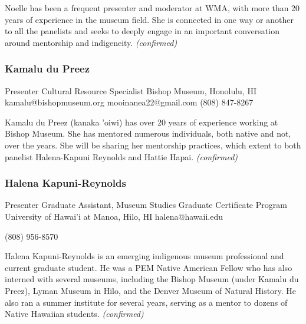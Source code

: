 \documentclass{report}
\begin{document}
                Noelle has been a frequent presenter and moderator at WMA, with more than 20 years of experience in the museum field. She is connected in one way or another to all the panelists and seeks to deeply engage in an important conversation around mentorship and indigeneity.\newline
                \emph{ (confirmed) }
              

              
                \subsubsection*{ Kamalu  du Preez }
                Presenter\newline
                Cultural Resource Specialist\newline
                Bishop Museum, Honolulu, HI
                \newline
                kamalu@bishopmuseum.org\newline
                mooinanea22@gmail.com\newline
                (808) 847-8267\newline

                Kamalu du Preez (kanaka 'oiwi) has over 20 years of experience working at
Bishop Museum. She has mentored numerous individuals, both native and not, over the years. She will be sharing her mentorship practices, which extent to both panelist Halena-Kapuni Reynolds and Hattie Hapai.
                \emph{ (confirmed) }
              

              
                \subsubsection*{ Halena  Kapuni-Reynolds }
                Presenter\newline
                Graduate Assistant, Museum Studies Graduate Certificate Program\newline
                University of Hawai'i at Manoa, Hilo, HI
                \newline
                halena@hawaii.edu\newline
                
                (808) 956-8570\newline

                Halena Kapuni-Reynolds is an emerging indigenous museum professional and current graduate student. He was a PEM Native American Fellow who has also interned with several museums, including the Bishop Museum (under Kamalu du Preez), Lyman Museum in Hilo, and the Denver Museum of Natural History.  He also ran a summer institute for several years, serving as a mentor to dozens of Native Hawaiian students.
                \emph{ (confirmed) }
              
\end{document}
